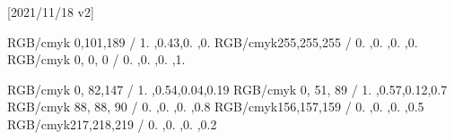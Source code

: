 %
[2021/11/18 v2]
%
%

\RequirePackage[utf8]{inputenc}
\RequirePackage{a4wide}   %
\RequirePackage{float}
\RequirePackage{color}
\RequirePackage{tabularx}
\RequirePackage{amsthm}
\RequirePackage{amsmath}
\RequirePackage{amssymb}
\RequirePackage{pdfpages}
\RequirePackage{multicol} %
\renewcommand{\columnseprule}{0pt}
\RequirePackage{calc}
\RequirePackage{tikz}
\RequirePackage{xargs}    %
\RequirePackage{courier}
\RequirePackage{enumitem}
\RequirePackage{ifthen}   %
\RequirePackage{graphicx} %
\RequirePackage{url}      %
\RequirePackage{cmap}     %
\RequirePackage{hyperref} %

  \setlength{\headheight}{13pt}

\definecolor{TUMBlue}        {RGB/cmyk}{  0,101,189 / 1.  ,0.43,0.  ,0.  }
\definecolor{TUMWhite}       {RGB/cmyk}{255,255,255 / 0.  ,0.  ,0.  ,0.  }
\definecolor{TUMBlack}       {RGB/cmyk}{  0,  0,  0 / 0.  ,0.  ,0.  ,1.  }

\definecolor{TUMBlueDark}    {RGB/cmyk}{  0, 82,147 / 1.  ,0.54,0.04,0.19}
\definecolor{TUMBlueDarker}  {RGB/cmyk}{  0, 51, 89 / 1.  ,0.57,0.12,0.7 }
\definecolor{TUMGrayDark}    {RGB/cmyk}{ 88, 88, 90 / 0.  ,0.  ,0.  ,0.8 }
\definecolor{TUMGray}        {RGB/cmyk}{156,157,159 / 0.  ,0.  ,0.  ,0.5 }
\definecolor{TUMGrayLight}   {RGB/cmyk}{217,218,219 / 0.  ,0.  ,0.  ,0.2 }

